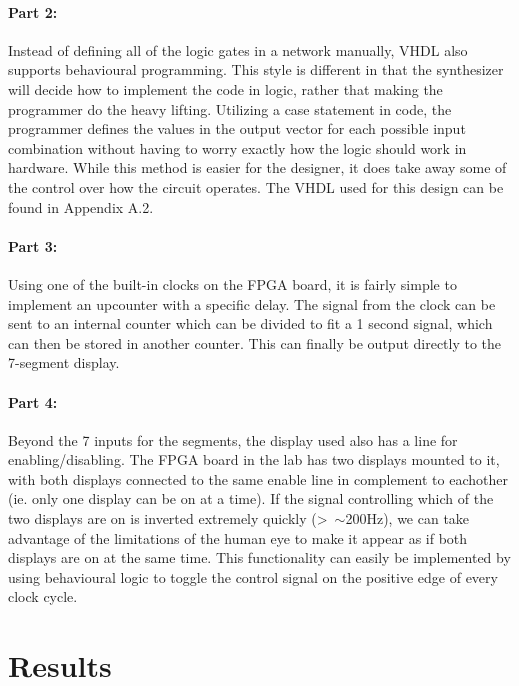 \documentclass{article}
\begin{document}
\paragraph{Part 2:}

Instead of defining all of the logic gates in a network manually, VHDL also supports
behavioural programming.
This style is different in that the synthesizer will decide how to implement
the code in logic, rather that making the programmer do the heavy lifting.
Utilizing a case statement in code, the programmer defines the values in the output vector for each possible input combination
without having to worry exactly how the logic should work in hardware.
While this method is easier for the designer, it does take away some of the control over how the circuit operates.
The VHDL used for this design can be found in Appendix A.2.

\paragraph{Part 3:}

Using one of the built-in clocks on the FPGA board, it is fairly simple to implement an upcounter with a specific delay.
The signal from the clock can be sent to an internal counter which can
be divided to fit a 1 second signal, which can then be stored in another counter. This can finally be output directly to the 7-segment display.

\paragraph{Part 4:}

Beyond the 7 inputs for the segments, the display used also has a line for enabling/disabling. The FPGA board in the lab has two displays mounted to it, with both displays connected to the same enable line in complement to eachother (ie. only one display can be on at a time). If the signal controlling which of the two displays are on is inverted 
extremely quickly (\textgreater\ $\sim$200Hz), we can take advantage of the limitations
of the human eye to make it appear as if both displays are on at the same time.
This functionality can easily be implemented by using behavioural logic to
toggle the control signal on the positive edge of every clock cycle.

\section{Results}
\end{document}
